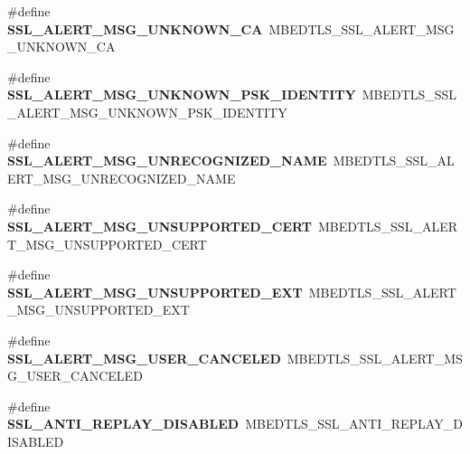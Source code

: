 \begin{DoxyCompactItemize}
\#define {\bfseries S\+S\+L\+\_\+\+A\+L\+E\+R\+T\+\_\+\+M\+S\+G\+\_\+\+U\+N\+K\+N\+O\+W\+N\+\_\+\+CA}~M\+B\+E\+D\+T\+L\+S\+\_\+\+S\+S\+L\+\_\+\+A\+L\+E\+R\+T\+\_\+\+M\+S\+G\+\_\+\+U\+N\+K\+N\+O\+W\+N\+\_\+\+CA
\item 
\mbox{\label{compat-1_83_8h_a0ea430b2b401f16bf572c16fa0c8804c}} 
\#define {\bfseries S\+S\+L\+\_\+\+A\+L\+E\+R\+T\+\_\+\+M\+S\+G\+\_\+\+U\+N\+K\+N\+O\+W\+N\+\_\+\+P\+S\+K\+\_\+\+I\+D\+E\+N\+T\+I\+TY}~M\+B\+E\+D\+T\+L\+S\+\_\+\+S\+S\+L\+\_\+\+A\+L\+E\+R\+T\+\_\+\+M\+S\+G\+\_\+\+U\+N\+K\+N\+O\+W\+N\+\_\+\+P\+S\+K\+\_\+\+I\+D\+E\+N\+T\+I\+TY
\item 
\mbox{\label{compat-1_83_8h_a00ab2865abf2de37dda6889f1753a984}} 
\#define {\bfseries S\+S\+L\+\_\+\+A\+L\+E\+R\+T\+\_\+\+M\+S\+G\+\_\+\+U\+N\+R\+E\+C\+O\+G\+N\+I\+Z\+E\+D\+\_\+\+N\+A\+ME}~M\+B\+E\+D\+T\+L\+S\+\_\+\+S\+S\+L\+\_\+\+A\+L\+E\+R\+T\+\_\+\+M\+S\+G\+\_\+\+U\+N\+R\+E\+C\+O\+G\+N\+I\+Z\+E\+D\+\_\+\+N\+A\+ME
\item 
\mbox{\label{compat-1_83_8h_acab76dfccc5286d385afa9c41a2cbbda}} 
\#define {\bfseries S\+S\+L\+\_\+\+A\+L\+E\+R\+T\+\_\+\+M\+S\+G\+\_\+\+U\+N\+S\+U\+P\+P\+O\+R\+T\+E\+D\+\_\+\+C\+E\+RT}~M\+B\+E\+D\+T\+L\+S\+\_\+\+S\+S\+L\+\_\+\+A\+L\+E\+R\+T\+\_\+\+M\+S\+G\+\_\+\+U\+N\+S\+U\+P\+P\+O\+R\+T\+E\+D\+\_\+\+C\+E\+RT
\item 
\mbox{\label{compat-1_83_8h_addf1aa49c1188a3be39aa7138f3f0432}} 
\#define {\bfseries S\+S\+L\+\_\+\+A\+L\+E\+R\+T\+\_\+\+M\+S\+G\+\_\+\+U\+N\+S\+U\+P\+P\+O\+R\+T\+E\+D\+\_\+\+E\+XT}~M\+B\+E\+D\+T\+L\+S\+\_\+\+S\+S\+L\+\_\+\+A\+L\+E\+R\+T\+\_\+\+M\+S\+G\+\_\+\+U\+N\+S\+U\+P\+P\+O\+R\+T\+E\+D\+\_\+\+E\+XT
\item 
\mbox{\label{compat-1_83_8h_a42430d65a46a924d2e89cd2909c0783a}} 
\#define {\bfseries S\+S\+L\+\_\+\+A\+L\+E\+R\+T\+\_\+\+M\+S\+G\+\_\+\+U\+S\+E\+R\+\_\+\+C\+A\+N\+C\+E\+L\+ED}~M\+B\+E\+D\+T\+L\+S\+\_\+\+S\+S\+L\+\_\+\+A\+L\+E\+R\+T\+\_\+\+M\+S\+G\+\_\+\+U\+S\+E\+R\+\_\+\+C\+A\+N\+C\+E\+L\+ED
\item 
\mbox{\label{compat-1_83_8h_ae79771c906f7ca3084708c44e0ee84f6}} 
\#define {\bfseries S\+S\+L\+\_\+\+A\+N\+T\+I\+\_\+\+R\+E\+P\+L\+A\+Y\+\_\+\+D\+I\+S\+A\+B\+L\+ED}~M\+B\+E\+D\+T\+L\+S\+\_\+\+S\+S\+L\+\_\+\+A\+N\+T\+I\+\_\+\+R\+E\+P\+L\+A\+Y\+\_\+\+D\+I\+S\+A\+B\+L\+ED

\end{DoxyCompactItemize}
